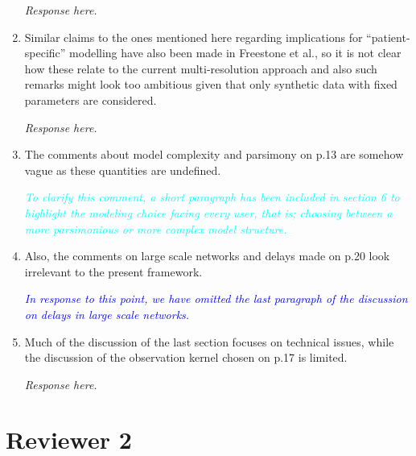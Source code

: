 \documentclass{article}
\newcommand{\parham}[1]{\textcolor{blue}{#1}}
\newcommand{\ken}[1]{\textcolor{cyan}{#1}}
\begin{document}
\begin{enumerate}
\emph{Response here.}

				\item Similar claims to the ones mentioned here regarding  implications for ``patient-specific'' modelling have also been made in Freestone et al., so it is not clear how these relate to the current multi-resolution approach and also such remarks might look too ambitious given that only synthetic data with fixed parameters are considered.
				
				\emph{Response here.}
				
				\item The comments about model complexity and parsimony on p.13 are somehow vague as these quantities are undefined.
				
				
				\emph{\ken{To clarify this comment, a short paragraph has been included in section 6 to highlight the modeling choice facing every user, that is; choosing between a more parsimonious or more complex model structure.}}
				
				\item Also, the comments on large scale networks and delays made on p.20 look irrelevant to the present framework.
				
				\emph{\parham{In response to this point, we have omitted the last paragraph of the discussion on delays in large scale networks.}}
				
				\item Much of the discussion of the last section focuses on technical issues, while the discussion of the observation kernel chosen on p.17 is limited.
				
				\emph{Response here.}

    \end{enumerate}
    
    \section{Reviewer 2}
    
\end{document}
